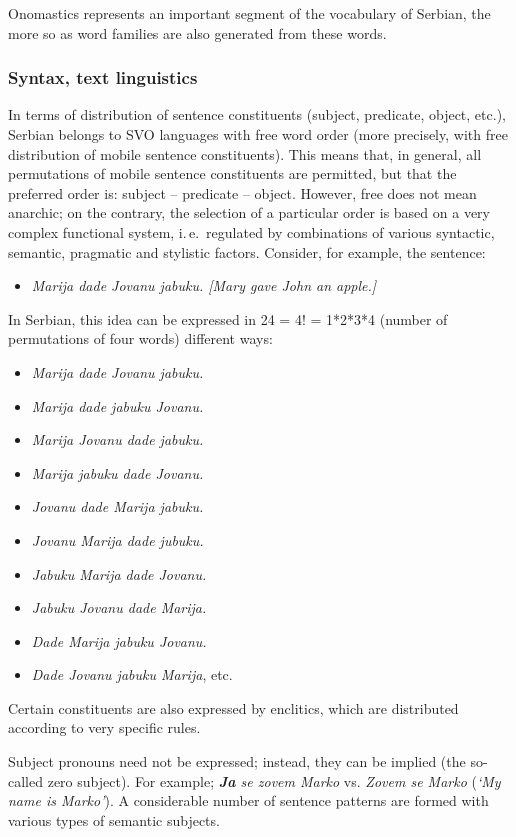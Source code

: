 \begin{multicols}{2}
Onomastics represents an important segment of the vocabulary of Serbian, the more so as word families are also generated from these words. 

\subsubsection {Syntax, text linguistics}

In terms of distribution of sentence constituents (subject, predicate, object, etc.), Serbian belongs to SVO languages with free word order (more precisely, with free distribution of mobile sentence constituents). This means that, in general, all permutations of mobile sentence constituents are permitted, but that the preferred order is: subject – predicate – object. However, free does not mean anarchic; on the contrary, the selection of a particular order is based on a very complex functional system, i.\,e.~regulated by combinations of various syntactic, semantic, pragmatic and stylistic factors.  Consider, for example, the sentence:
\begin{itemize}
 \item \textit{Marija dade Jovanu jabuku. [Mary gave John an apple.]} 
\end{itemize}
In Serbian, this idea can be expressed in 24 = 4! = 1*2*3*4 (number of permutations of four words) different ways:
\begin{itemize}
 \item \textit{Marija dade Jovanu jabuku.}
 \item \textit{Marija dade jabuku Jovanu.}
\item \textit{Marija Jovanu dade jabuku.} 
\item \textit{Marija jabuku dade Jovanu.}
\item \textit{Jovanu dade Marija jabuku.}
\item \textit{Jovanu Marija dade jubuku.}
\item \textit{Jabuku Marija dade Jovanu.}
\item \textit{Jabuku Jovanu dade Marija.}
\item \textit{Dade Marija jabuku Jovanu. }
\item \textit{Dade Jovanu jabuku Marija}, etc.
\end{itemize}
Certain constituents are also expressed by enclitics, which are distributed according to very specific rules. 

Subject pronouns need not be expressed; instead, they can be implied (the so-called zero subject). For example; \textit{\textbf{Ja} se zovem Marko} vs. \textit{Zovem se Marko} (\textit{‘My name is Marko’}). A considerable number of sentence patterns are formed with various types of semantic subjects. 


\end{multicols}
